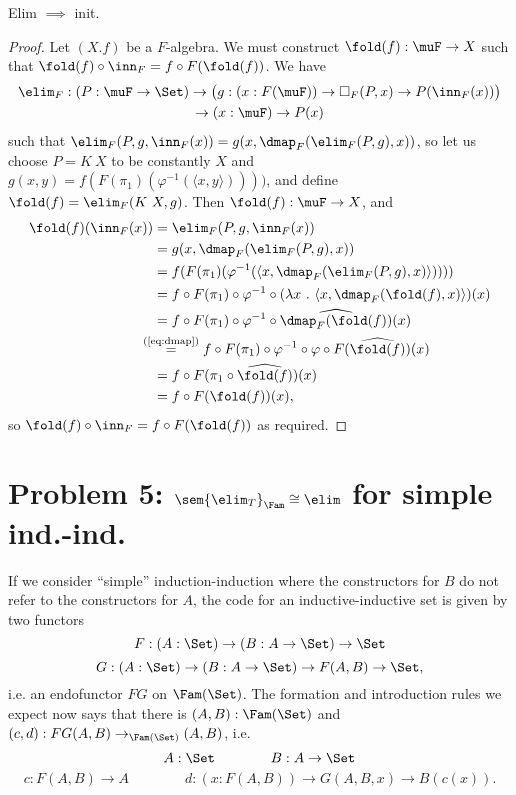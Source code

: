 \documentclass{article}
\begin{document}
\begin{problem}
  Elim $\implies$ init.
\end{problem}
\begin{proof}
  Let $(X. f)$ be a $F$-algebra. We must construct $\fold(f) : \muF
  \to X$ such that $\fold(f) \circ \inn_F = f \circ F(\fold(f))$. We have 
  \begin{multline*}
    \elim_F : (P : \muF \to \Set) \to \big(g : (x : F(\muF)) \to \square_F(P, x) \to P(\inn_F(x))\big) \\ \to (x : \muF) \to P(x)
  \end{multline*}
  such that $\elim_F(P, g, \inn_F(x)) = g(x, \dmap_F(\elim_F(P, g), x))$,
  so let us choose $P = K\ X$ to be constantly $X$ and
$g(x, y) = f(F(\pi_1)(\varphi^{-1}(\langle x, y\rangle))))$, and define $\fold(f) = \elim_F(K\ X, g)$. Then $\fold(f) : \muF \to X$, and
\begin{align*}
  \fold(f)(\inn_F(x)) &= \elim_F(P, g, \inn_F(x)) \\
  &= g(x, \dmap_F(\elim_F(P, g), x)) \\
  &= f(F(\pi_1)(\varphi^{-1}(\langle x, \dmap_F(\elim_F(P, g), x)\rangle)))) \\
  &= f \circ F(\pi_1) \circ \varphi^{-1} \circ (\lambda x\ .\ \langle x, \dmap_F(\fold(f), x)\rangle)(x) \\
  &= f \circ F(\pi_1) \circ \varphi^{-1} \circ \widehat{\dmap_F(\fold(f))}(x) \\
  &\!\!\!\!\!\!\stackrel{\text{(\ref{eq:dmap})}}{=} f \circ F(\pi_1) \circ \varphi^{-1} \circ \varphi \circ F(\widehat{\fold(f)})(x) \\
  &= f \circ F(\pi_1 \circ \widehat{\fold(f)})(x) \\
  &= f \circ F(\fold(f))(x),
\end{align*}
so $\fold(f) \circ \inn_F = f \circ F(\fold(f))$ as required.
\end{proof}

\section*{Problem 5: $\sem{\elim_T}_{\Fam} \cong \elim$ for simple ind.-ind.}

If we consider ``simple'' induction-induction where the constructors
for $B$ do not refer to the constructors for $A$, the code for an
inductive-inductive set is given by two functors
\[
F : (A : \Set) \to (B : A \to \Set) \to \Set
\]
\[
G : (A : \Set) \to (B : A \to \Set) \to F(A, B) \to \Set,
\]
i.e. an endofunctor $FG$ on $\Fam(\Set)$. The formation and
introduction rules we expect now says that there is $(A, B) :
\Fam(\Set)$ and $(c, d) : FG(A, B) \to_{\Fam(\Set)} (A, B)$, i.e.
\[
A : \Set \qquad \qquad B : A \to \Set
\]
\[
c : F(A, B) \to A \qquad \qquad d : (x : F(A, B)) \to G(A, B, x) \to B(c(x)).
\]
\end{document}
